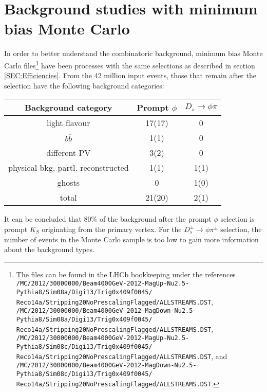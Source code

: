 \section{Background studies with minimum bias Monte Carlo}

In order to better understand the combinatoric background, minimum bias Monte Carlo files\footnote{The files can be found in the LHCb bookkeeping under the references \texttt{/MC/2012/30000000/Beam4000GeV-2012-MagUp-Nu2.5-Pythia8/Sim08a/Digi13/Trig0x409f0045/\\Reco14a/Stripping20NoPrescalingFlagged/ALLSTREAMS.DST},\\\texttt{/MC/2012/30000000/Beam4000GeV-2012-MagDown-Nu2.5-Pythia8/Sim08a/Digi13/Trig0x409f0045/\\Reco14a/Stripping20NoPrescalingFlagged/ALLSTREAMS.DST},\\\texttt{/MC/2012/30000000/Beam4000GeV-2012-MagUp-Nu2.5-Pythia8/Sim08c/Digi13/Trig0x409f0045/\\Reco14a/Stripping20NoPrescalingFlagged/ALLSTREAMS.DST}, and \\\texttt{/MC/2012/30000000/Beam4000GeV-2012-MagDown-Nu2.5-Pythia8/Sim08c/Digi13/Trig0x409f0045/\\Reco14a/Stripping20NoPrescalingFlagged/ALLSTREAMS.DST}.} have been processes with the same selections as described in section \ref{SEC:Efficiencies}.  From the 42 million input events, those that remain after the selection have the following background categories:
\begin{center}
\begin{tabular}{c|c|c}
Background category & Prompt $\phi$ & $D_s \rightarrow \phi \pi$ \\ 
\hline 
light flavour & 17(17) & 0 \\ 
$b\overline{b}$ & 1(1) & 0 \\ 
different PV & 3(2) & 0 \\ 
physical bkg, partl. reconstructed & 1(1) & 1(1) \\ 
ghosts & 0 & 1(0) \\ 
\hline 
total & 21(20) & 2(1) \\  
\end{tabular} 
\end{center}

It can be concluded that 80\% of the background after the prompt $\phi$ selection is prompt $K_S$ originating from the primary vertex. For the $D_s^\pm \rightarrow \phi\pi^\pm$ selection, the number of events in the Monte Carlo sample is too low to gain more information about the background types.

